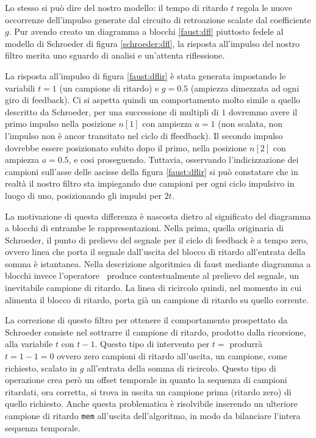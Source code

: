 \begin{refsection}
Lo stesso si può dire del nostro modello: il tempo di ritardo $t$ regola le
nuove occorrenze dell'impulso generate dal
circuito di retroazione scalate dal coefficiente $g$. Pur avendo creato un
diagramma a blocchi \ref{faust:dfl} piuttosto fedele al modello di Schroeder di
figura \ref{schroeder:dfl}, la risposta all'impulso del nostro filtro merita
uno sguardo di analisi e un'attenta riflessione.



La risposta all'impulso di figura \ref{faust:dflir} è stata generata impostando
le variabili $t=1$ (un campione di ritardo) e $g=0.5$ (ampiezza dimezzata ad
ogni giro di feedback). Ci si aspetta quindi un comportamento molto simile a
quello descritto da Schroeder, per una successione di multipli di $1$ dovremmo
avere il primo impulso nella posizione $n[1]$ con ampiezza $a=1$ (non scalata,
non l'impulso non è ancor transitato nel ciclo di ffeedback). Il secondo impulso
dovrebbe essere posizionato subito dopo il primo, nella posizione $n[2]$ con
ampiezza $a=0.5$, e cosi proseguendo. Tuttavia, osservando l'indicizzazione dei
campioni sull'asse delle ascisse della figura \ref{faust:dflir} si può constatare
che in realtà il nostro filtro sta impiegando due campioni per ogni ciclo
impulsivo in luogo di uno, posizionando gli impulsi per $2t$.

La motivazione di questa differenza è nascosta dietro al significato del diagramma
a blocchi di entrambe le rappresentazioni. Nella prima, quella originaria di Schroeder,
il punto di prelievo del segnale per il ciclo di feedback è a tempo zero, ovvero
linea che porta il segnale dall'uscita del blocco di ritardo all'entrata della
somma è istantanea. Nella descrizione algoritmica di faust mediante diagramma
a blocchi invece l'operatore $~$ produce contestualmente al prelievo del segnale,
un inevitabile campione di ritardo. La linea di ricircolo quindi, nel momento
in cui alimenta il blocco di ritardo, porta già un campione di ritardo su quello
corrente.

La correzione di questo filtro per ottenere il comportamento prospettato da Schroeder
consiste nel sottrarre il campione di ritardo, prodotto dalla ricorsione, alla
variabile $t$ con $t-1$. Questo tipo di intervento per $t=$ produrrà $t=1-1=0$
ovvero zero campioni di ritardo all'uscita, un campione, come richiesto,
scalato in $g$ all'entrata della somma di ricircolo. Questo tipo di operazione
crea però un offset temporale in quanto la sequenza di campioni ritardati, ora
corretta, si trova in uscita un campione prima (ritardo zero) di quello richiesto.
Anche questa problematica è risolvibile inserendo un ulteriore campione di ritardo
\texttt{mem} all'uscita dell'algoritmo, in modo da bilanciare l'intera sequenza
temporale.


\end{refsection}

